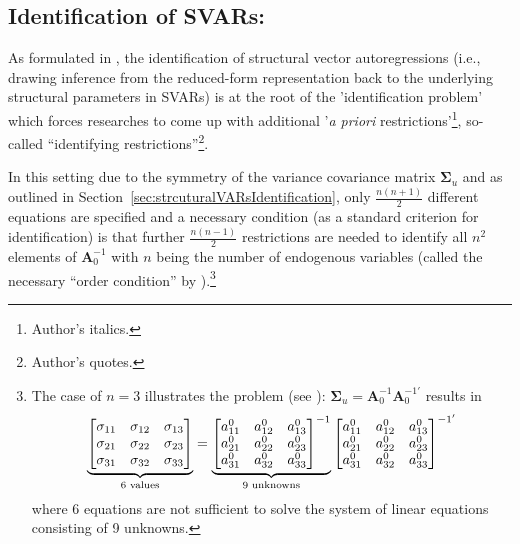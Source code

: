 \documentclass[a4paper,11pt,listof=nochaptergap,oneside,pointednumbers,bibtotoc,bigheadings,liststotoc,hidelinks]{scrbook}
\theoremstyle{mysatz}
\theoremstyle{mydefinition}
\theoremstyle{mytheorem}
\theoremstyle{mybemerkung}
\newcommand{\vect}[1]{\boldsymbol{\mathbf{#1}}}
\begin{document}
	
	
\subsection{Identification of SVARs: \citet{rubioetal:10}}
\label{sec:observationalEquivalence}
As formulated in \citet{rubioetal:10}, the identification of structural vector autoregressions (i.e., drawing inference from the reduced-form representation back to the underlying structural parameters in SVARs) is at the root of the 'identification problem' which forces researches to come up with additional '\textit{a priori} restrictions'\footnote{Author's italics.}, so-called ``identifying restrictions''\footnote{Author's quotes.}.

In this setting due to the symmetry of the variance covariance matrix $\vect{\Sigma}_u$ and as outlined in Section~\ref{sec:strcuturalVARsIdentification}, only $\frac{n(n+1)}{2}$ different equations are specified and a necessary condition (as a standard criterion for identification) is that further $\frac{n(n-1)}{2}$ restrictions are needed to identify all $n^2$ elements of $\vect{A}_0^{-1}$ with $n$ being the number of endogenous variables (called the necessary ``order condition'' by \citealp{rothenberg:71}).\footnote{The case of $n=3$ illustrates the problem (see \citealp{foroni:14}): $\vect{\Sigma}_u = \vect{A}_{0}^{-1} \vect{A}_{0}^{-1'}$ results in $$		
		\underbrace{%
		\begin{bmatrix}
    		\sigma_{11} & \sigma_{12} & \sigma_{13} \\
		\sigma_{21} & \sigma_{22} & \sigma_{23} \\
		\sigma_{31} & \sigma_{32} & \sigma_{33}
 		\end{bmatrix}
}_{\text{6 values}} = \underbrace{%
		\begin{bmatrix}
    		a_{11}^0 & a_{12}^0 & a_{13}^0 \\
		a_{21}^0 & a_{22}^0 & a_{23}^0 \\
		a_{31}^0 & a_{32}^0 & a_{33}^0
 		\end{bmatrix}^{-1}
}_{\text{9 unknowns}}
\begin{bmatrix}
    		a_{11}^0 & a_{12}^0 & a_{13}^0 \\
		a_{21}^0 & a_{22}^0 & a_{23}^0 \\
		a_{31}^0 & a_{32}^0 & a_{33}^0
 		\end{bmatrix}^{{-1}'}$$ 
		where 6 equations are not sufficient to solve the system of linear equations consisting of 9 unknowns.}
		
\end{document}
